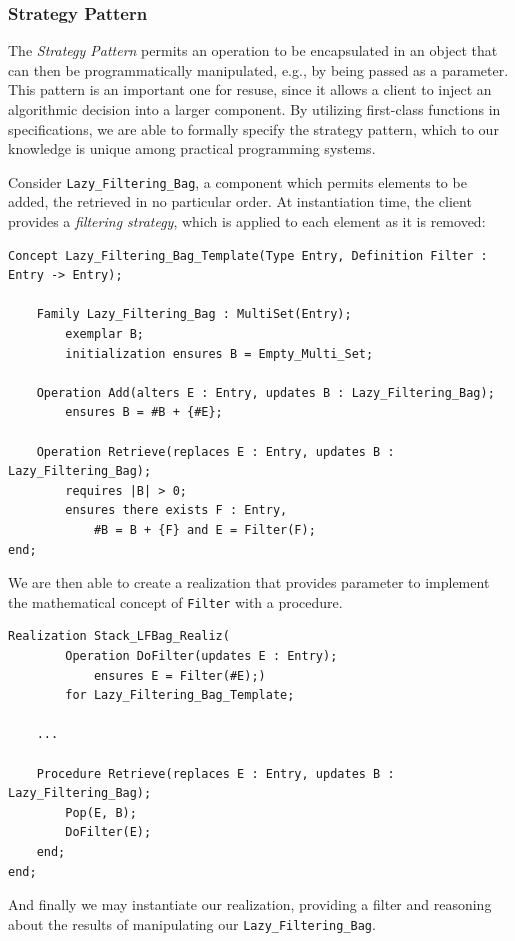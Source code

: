 		\subsubsection{Strategy Pattern\label{strategyPattern}}

The \emph{Strategy Pattern} permits an operation to be encapsulated in an object that can then be programmatically manipulated, e.g., by being passed as a parameter.  This pattern is an important one for resuse, since it allows a client to inject an algorithmic decision into a larger component.  By utilizing first-class functions in specifications, we are able to formally specify the strategy pattern, which to our knowledge is unique among practical programming systems.

Consider \texttt{Lazy\_Filtering\_Bag}, a component which permits elements to be added, the retrieved in no particular order.   At instantiation time, the client provides a \emph{filtering strategy}, which is applied to each element as it is removed:

\begin{lstlisting}
Concept Lazy_Filtering_Bag_Template(Type Entry, Definition Filter : Entry -> Entry);
	
	Family Lazy_Filtering_Bag : MultiSet(Entry);
		exemplar B;
		initialization ensures B = Empty_Multi_Set;

	Operation Add(alters E : Entry, updates B : Lazy_Filtering_Bag);
		ensures B = #B + {#E};

	Operation Retrieve(replaces E : Entry, updates B : Lazy_Filtering_Bag);
		requires |B| > 0;
		ensures there exists F : Entry,
			#B = B + {F} and E = Filter(F);
end;
\end{lstlisting}

We are then able to create a realization that provides parameter to implement the mathematical concept of \texttt{Filter} with a procedure.

\begin{lstlisting}
Realization Stack_LFBag_Realiz(
		Operation DoFilter(updates E : Entry);
			ensures E = Filter(#E);)
		for Lazy_Filtering_Bag_Template;

	...

	Procedure Retrieve(replaces E : Entry, updates B : Lazy_Filtering_Bag);
		Pop(E, B);
		DoFilter(E);
	end;
end;
\end{lstlisting}

And finally we may instantiate our realization, providing a filter and reasoning about the results of manipulating our \texttt{Lazy\_Filtering\_Bag}.

